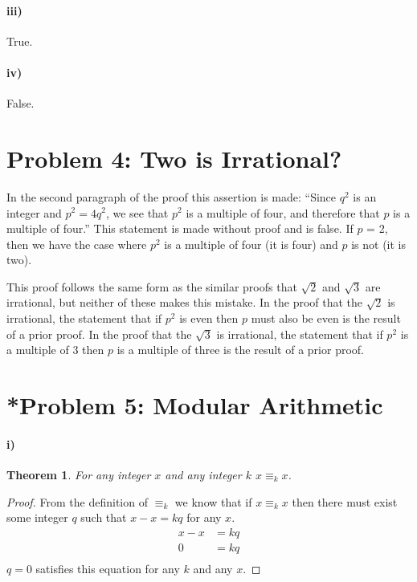 \documentclass[10pt,letter]{article}
\newtheorem*{thm}{Theorem}
\begin{document}
\paragraph{iii)} True.

\paragraph{iv)} False.

\section*{Problem 4: Two is Irrational?}
In the second paragraph of the proof this assertion is made: ``Since $q^2$ is an integer and $p^2 = 4q^2$, we see that $p^2$ is a multiple of four, and therefore that $p$ is a multiple of four.'' This statement is made without proof and is false. If $p$ = 2, then we have the case where $p^2$ is a multiple of four (it is four) and $p$ is not (it is two).

This proof follows the same form as the similar proofs that $\sqrt{2}$ and $\sqrt{3}$ are irrational, but neither of these makes this mistake. In the proof that the $\sqrt{2}$ is irrational, the statement that if $p^2$ is even then $p$ must also be even is the result of a prior proof. In the proof that the $\sqrt{3}$ is irrational, the statement that if $p^2$ is a multiple of 3 then $p$ is a multiple of three is the result of a prior proof. 

\section*{*Problem 5: Modular Arithmetic}
\paragraph{i)} 
\begin{thm}
  For any integer $x$ and any integer $k$ $x \equiv_k x$.
\end{thm}
\begin{proof}
  From the definition of $\equiv_k$ we know that if $x \equiv_k x$ then there must exist some integer $q$ such that $x - x = kq$ for any $x$.
  \begin{align*}
    x - x &= kq\\
    0 &= kq\\
  \end{align*}
  $q = 0$ satisfies this equation for any $k$ and any $x$.
\end{proof}
            
\end{document}
